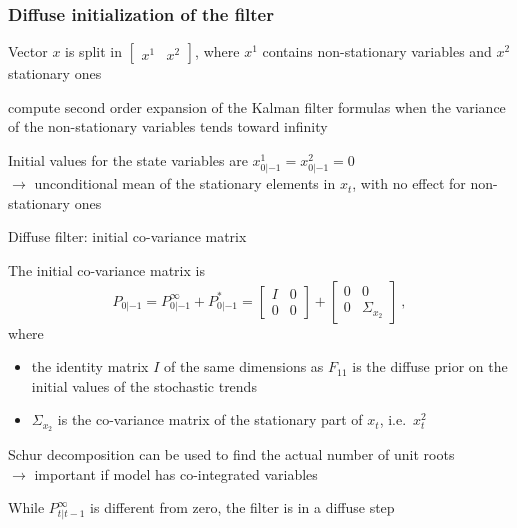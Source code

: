 \documentclass[handout,usepdftitle=false,xcolor=dvipsnames,aspectratio=169]{beamer}
\begin{document}
\begin{frame}
  \frametitle{Diffuse initialization of the filter}

  \begin{witemize}
    \item Vector $ x $ is split in $ \begin{bmatrix} x^1 & x^2 \end{bmatrix} $, where $ x^1 $ contains non-stationary variables and $x^2$ stationary ones
    \item \textcite{KoopmanDurbin2003} compute second order expansion of the Kalman filter formulas when the variance of the non-stationary variables tends toward infinity
    \item Initial values for the state variables are $ x^1_{0|-1} =x^2_{0|-1}= 0 $\\
    $\rightarrow$ unconditional mean of the stationary elements in $ x_t $, with no effect for non-stationary ones
  \end{witemize}

\end{frame}

\begin{frame}{Diffuse filter: initial co-variance matrix}
  \begin{witemize}
    \item The initial co-variance matrix is
    \begin{equation}
      P_{0|-1} = P^{\infty}_{0|-1} + P^{*}_{0|-1} = \begin{bmatrix} I & 0 \\ 0 & 0 \end{bmatrix} + \begin{bmatrix} 0 & 0 \\ 0 & \Sigma_{x_2} \end{bmatrix} \: ,
    \end{equation}
    where
    \begin{itemize}
      \item the identity matrix $I$ of the same dimensions as $ F_{11}$ is the diffuse prior on the initial values of the stochastic trends
      \item $ \Sigma_{x_2} $ is the co-variance matrix of the stationary part of $x_t$, i.e.\ $x_t^2$
    \end{itemize}
    \item Schur decomposition can be used to find the actual number of unit roots\\
    $\rightarrow$ important if model has co-integrated variables
    \item While $P^{\infty}_{t|t-1}$ is different from zero, the filter is in a diffuse step
  \end{witemize}

\end{frame}
\end{document}
